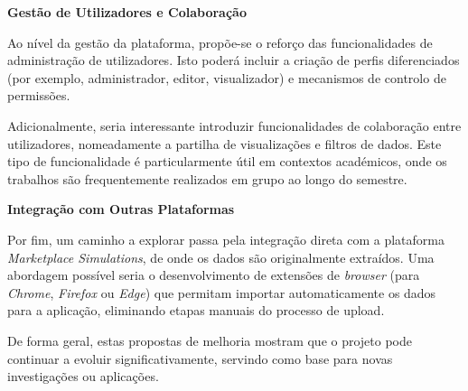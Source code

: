 \textbf{Gestão de Utilizadores e Colaboração}

Ao nível da gestão da plataforma, propõe-se o reforço das funcionalidades de administração de utilizadores. Isto poderá incluir a criação de perfis diferenciados (por exemplo, administrador, editor, visualizador) e mecanismos de controlo de permissões.

Adicionalmente, seria interessante introduzir funcionalidades de colaboração entre utilizadores, nomeadamente a partilha de visualizações e filtros de dados. Este tipo de funcionalidade é particularmente útil em contextos académicos, onde os trabalhos são frequentemente realizados em grupo ao longo do semestre.

\textbf{Integração com Outras Plataformas}

Por fim, um caminho a explorar passa pela integração direta com a plataforma \textit{Marketplace Simulations}, de onde os dados são originalmente extraídos. Uma abordagem possível seria o desenvolvimento de extensões de \textit{browser} (para \textit{Chrome}, \textit{Firefox} ou \textit{Edge}) que permitam importar automaticamente os dados para a aplicação, eliminando etapas manuais do processo de upload.

De forma geral, estas propostas de melhoria mostram que o projeto pode continuar a evoluir significativamente, servindo como base para novas investigações ou aplicações.